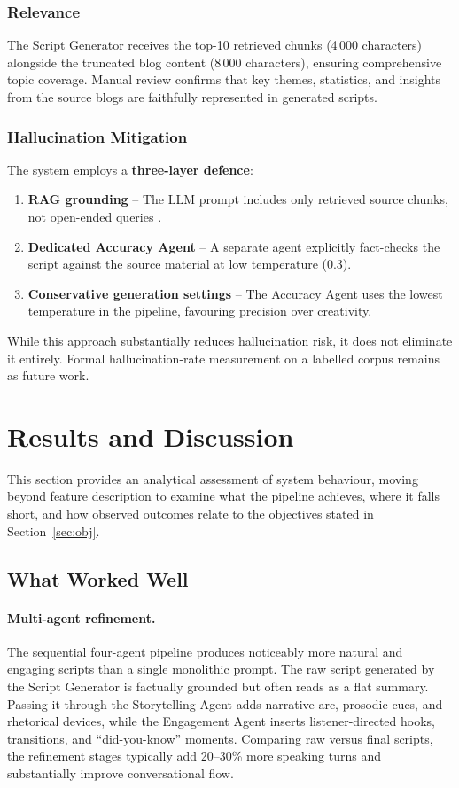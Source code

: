 \documentclass[sigconf,natbib=false]{acmart}   %
\begin{document}
\subsubsection{Relevance}
The Script Generator receives the top-10 retrieved chunks (4\,000 characters) alongside the truncated blog content (8\,000 characters), ensuring comprehensive topic coverage.  Manual review confirms that key themes, statistics, and insights from the source blogs are faithfully represented in generated scripts.

\subsubsection{Hallucination Mitigation}
The system employs a \textbf{three-layer defence}:
\begin{enumerate}[nosep]
  \item \textbf{RAG grounding} -- The LLM prompt includes only retrieved source chunks, not open-ended queries \cite{Gao2022RAGSurvey}.
  \item \textbf{Dedicated Accuracy Agent} -- A separate agent explicitly fact-checks the script against the source material at low temperature (0.3).
  \item \textbf{Conservative generation settings} -- The Accuracy Agent uses the lowest temperature in the pipeline, favouring precision over creativity.
\end{enumerate}
While this approach substantially reduces hallucination risk, it does not eliminate it entirely.  Formal hallucination-rate measurement on a labelled corpus remains as future work.

\section{Results and Discussion}
\label{sec:results}

This section provides an analytical assessment of system behaviour, moving beyond feature description to examine what the pipeline achieves, where it falls short, and how observed outcomes relate to the objectives stated in Section~\ref{sec:obj}.

\subsection{What Worked Well}

\paragraph{Multi-agent refinement.}
The sequential four-agent pipeline produces noticeably more natural and engaging scripts than a single monolithic prompt.  The raw script generated by the Script Generator is factually grounded but often reads as a flat summary.  Passing it through the Storytelling Agent adds narrative arc, prosodic cues, and rhetorical devices, while the Engagement Agent inserts listener-directed hooks, transitions, and ``did-you-know'' moments.  Comparing raw versus final scripts, the refinement stages typically add 20--30\% more speaking turns and substantially improve conversational flow.
\end{document}
